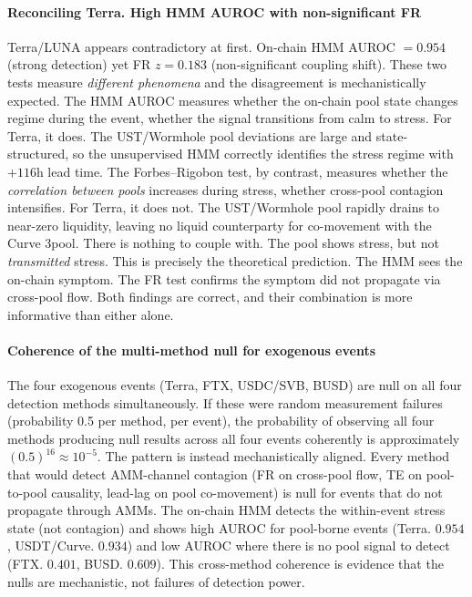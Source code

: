 \documentclass[sigconf,anonymous]{acmart}
\begin{document}
\paragraph{Reconciling Terra. High HMM AUROC with non-significant FR}
Terra/LUNA appears contradictory at first. On-chain HMM AUROC $= 0.954$ (strong detection) yet FR $z = 0.183$ (non-significant coupling shift).
These two tests measure \emph{different phenomena} and the disagreement is mechanistically expected.
The HMM AUROC measures whether the on-chain pool state changes regime during the event, whether the signal transitions from calm to stress.
For Terra, it does. The UST/Wormhole pool deviations are large and state-structured, so the unsupervised HMM correctly identifies the stress regime with $+116$h lead time.
The Forbes--Rigobon test, by contrast, measures whether the \emph{correlation between pools} increases during stress, whether cross-pool contagion intensifies.
For Terra, it does not. The UST/Wormhole pool rapidly drains to near-zero liquidity, leaving no liquid counterparty for co-movement with the Curve 3pool.
There is nothing to couple with.
The pool shows stress, but not \emph{transmitted} stress.
This is precisely the theoretical prediction. The HMM sees the on-chain symptom. The FR test confirms the symptom did not propagate via cross-pool flow.
Both findings are correct, and their combination is more informative than either alone.

\paragraph{Coherence of the multi-method null for exogenous events}
The four exogenous events (Terra, FTX, USDC/SVB, BUSD) are null on all four detection methods simultaneously.
If these were random measurement failures (probability 0.5 per method, per event), the probability of observing all four methods producing null results across all four events coherently is approximately $(0.5)^{16} \approx 10^{-5}$.
The pattern is instead mechanistically aligned. Every method that would detect AMM-channel contagion (FR on cross-pool flow, TE on pool-to-pool causality, lead-lag on pool co-movement) is null for events that do not propagate through AMMs.
The on-chain HMM detects the within-event stress state (not contagion) and shows high AUROC for pool-borne events (Terra. $0.954$, USDT/Curve. $0.934$) and low AUROC where there is no pool signal to detect (FTX. $0.401$, BUSD. $0.609$).
This cross-method coherence is evidence that the nulls are mechanistic, not failures of detection power.
\end{document}
